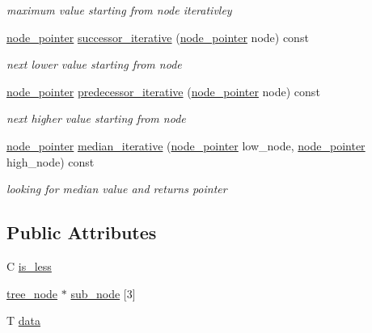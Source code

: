 \begin{DoxyCompactItemize}
\begin{DoxyCompactList}\small\item\em maximum value starting from node iterativley \end{DoxyCompactList}\item 
\hyperlink{structcrap_1_1tree__node_a66cd96114fc5aaf9806032e15960edc5}{node\-\_\-pointer} \hyperlink{structcrap_1_1tree__node_a9317be3fc25339094b5e1a0e199d0177}{successor\-\_\-iterative} (\hyperlink{structcrap_1_1tree__node_a66cd96114fc5aaf9806032e15960edc5}{node\-\_\-pointer} node) const 
\begin{DoxyCompactList}\small\item\em next lower value starting from node \end{DoxyCompactList}\item 
\hyperlink{structcrap_1_1tree__node_a66cd96114fc5aaf9806032e15960edc5}{node\-\_\-pointer} \hyperlink{structcrap_1_1tree__node_abf5971dc55273c15bb9064b9613ebe86}{predecessor\-\_\-iterative} (\hyperlink{structcrap_1_1tree__node_a66cd96114fc5aaf9806032e15960edc5}{node\-\_\-pointer} node) const 
\begin{DoxyCompactList}\small\item\em next higher value starting from node \end{DoxyCompactList}\item 
\hyperlink{structcrap_1_1tree__node_a66cd96114fc5aaf9806032e15960edc5}{node\-\_\-pointer} \hyperlink{structcrap_1_1tree__node_a591ff87dd86988f9efba84912a639194}{median\-\_\-iterative} (\hyperlink{structcrap_1_1tree__node_a66cd96114fc5aaf9806032e15960edc5}{node\-\_\-pointer} low\-\_\-node, \hyperlink{structcrap_1_1tree__node_a66cd96114fc5aaf9806032e15960edc5}{node\-\_\-pointer} high\-\_\-node) const 
\begin{DoxyCompactList}\small\item\em looking for median value and returns pointer \end{DoxyCompactList}\end{DoxyCompactItemize}
\subsection*{Public Attributes}
\begin{DoxyCompactItemize}
\item 
C \hyperlink{structcrap_1_1tree__node_af2196765b0e5f1e668f3d05ac006f63a}{is\-\_\-less}
\item 
\hyperlink{structcrap_1_1tree__node}{tree\-\_\-node} $\ast$ \hyperlink{structcrap_1_1tree__node_a437e16f20801c1c5bded5883f9b10c45}{sub\-\_\-node} \mbox{[}3\mbox{]}
\item 
T \hyperlink{structcrap_1_1tree__node_a118a7c8c8e975f1af0bdac99bb6f875a}{data}
\end{DoxyCompactItemize}


